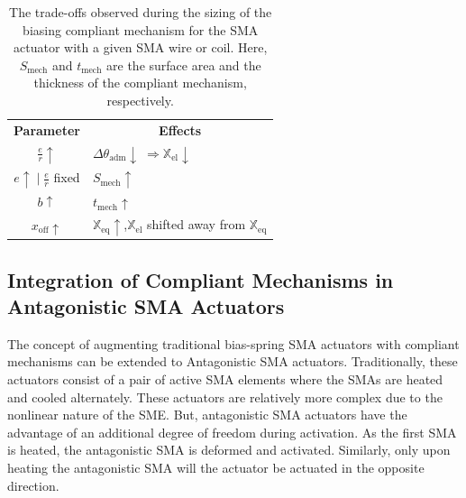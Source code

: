 \begin{table}[ht]
    \centering
    \caption{The trade-offs observed during the sizing of the biasing compliant mechanism for the SMA actuator with a given SMA wire or coil. Here, $S_{\text{mech}}$ and $t_{\text{mech}}$ are the surface area and the thickness of the compliant mechanism, respectively.}
    \label{tab:sma-pt-tradeoffs}
    \begin{tabular}{ c l l }
        \hline
        \rowcolor{black} \textbf{\color{white} Parameter} & \multicolumn{2}{c}{\textbf{\color{white} Effects}}\\
        \cellcolor{black!5}$\frac{e}{r} \uparrow$ & \cellcolor{black!5} $\Delta\theta_\text{adm} \downarrow \;  \Rightarrow \mathbb{X}_\text{el} \downarrow$  & \cellcolor{black!5}  \\

        \cellcolor{black!10} $e \uparrow \;|\; \frac{e}{r}$ fixed & \cellcolor{black!10} $S_{\text{mech}}\uparrow $ & \cellcolor{black!5} \\

        \cellcolor{black!5} $b \uparrow$ & \cellcolor{black!5} $t_{\text{mech}}\uparrow $ &\cellcolor{black!5} \multirow{-3}{*}{$K_\theta \uparrow \;
        \Rightarrow \begin{cases} \mathbb{X}_\text{eq} \uparrow\\ F_\text{grip} \downarrow\\
        \end{cases}$}     \\

         \rowcolor{black!10} $x_{\text{off}}\uparrow$ & \multicolumn{2}{l}{$\mathbb{X}_\text{eq}\uparrow$,\quad $\mathbb{X}_\text{el}$ shifted away from $\mathbb{X}_\text{eq}$}\\
    \end{tabular}
\end{table}

\subsection{Integration of Compliant Mechanisms in Antagonistic SMA Actuators}

The concept of augmenting traditional bias-spring SMA actuators with compliant mechanisms can be extended to Antagonistic SMA actuators. Traditionally, these actuators consist of a pair of active SMA elements where the SMAs are heated and cooled alternately. These actuators are relatively more complex due to the nonlinear nature of the SME. But, antagonistic SMA actuators have the advantage of an additional degree of freedom during activation. As the first SMA is heated, the antagonistic SMA is deformed and activated. Similarly, only upon heating the antagonistic SMA will the actuator be actuated in the opposite direction.

